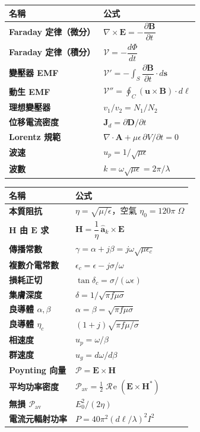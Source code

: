 \documentclass[12pt,a4paper]{article}
\newcommand{\vE}{\mathbf{E}}
\newcommand{\vB}{\mathbf{B}}
\newcommand{\vH}{\mathbf{H}}
\newcommand{\vJ}{\mathbf{J}}
\newcommand{\vD}{\mathbf{D}}
\newcommand{\vA}{\mathbf{A}}
\newcommand{\vu}{\mathbf{u}}
\newcommand{\ak}{\hat{\mathbf{a}}_k}
\newcommand{\emf}{\mathcal{V}}
\newcommand{\Rea}{\operatorname{\mathcal{R}\!e}}
\begin{document}
\begin{keybox}
\renewcommand{\arraystretch}{2.0}
\begin{tabular}{>{\bfseries}p{4cm} l}
\toprule
名稱 & 公式 \\
\midrule
Faraday 定律（微分） & $\nabla\times\vE = -\dfrac{\partial\vB}{\partial t}$ \\
Faraday 定律（積分） & $\emf = -\dfrac{d\Phi}{dt}$ \\
變壓器 EMF & $\emf' = -\displaystyle\int_S\dfrac{\partial\vB}{\partial t}\cdot d\mathbf{s}$ \\
動生 EMF & $\emf'' = \displaystyle\oint_C (\vu\times\vB)\cdot d\boldsymbol{\ell}$ \\
理想變壓器 & $v_1/v_2 = N_1/N_2$ \\
位移電流密度 & $\vJ_d = \partial\vD/\partial t$ \\
Lorentz 規範 & $\nabla\cdot\vA + \mu\epsilon\,\partial V/\partial t = 0$ \\
波速 & $u_p = 1/\sqrt{\mu\epsilon}$ \\
波數 & $k = \omega\sqrt{\mu\epsilon} = 2\pi/\lambda$ \\
\bottomrule
\end{tabular}
\end{keybox}

\begin{keybox}
\renewcommand{\arraystretch}{2.0}
\begin{tabular}{>{\bfseries}p{4cm} l}
\toprule
名稱 & 公式 \\
\midrule
本質阻抗 & $\eta = \sqrt{\mu/\epsilon}$，空氣 $\eta_0 = 120\pi\;\Omega$ \\
$\vH$ 由 $\vE$ 求 & $\vH = \dfrac{1}{\eta}\,\ak\times\vE$ \\
傳播常數 & $\gamma = \alpha + j\beta = j\omega\sqrt{\mu\epsilon_c}$ \\
複數介電常數 & $\epsilon_c = \epsilon - j\sigma/\omega$ \\
損耗正切 & $\tan\delta_c = \sigma/(\omega\epsilon)$ \\
集膚深度 & $\delta = 1/\sqrt{\pi f\mu\sigma}$ \\
良導體 $\alpha,\beta$ & $\alpha = \beta = \sqrt{\pi f\mu\sigma}$ \\
良導體 $\eta_c$ & $(1+j)\sqrt{\pi f\mu/\sigma}$ \\
相速度 & $u_p = \omega/\beta$ \\
群速度 & $u_g = d\omega/d\beta$ \\
Poynting 向量 & $\boldsymbol{\mathcal{P}} = \vE\times\vH$ \\
平均功率密度 & $\boldsymbol{\mathcal{P}}_{\text{av}} = \frac{1}{2}\Rea(\vE\times\vH^*)$ \\
無損 $\boldsymbol{\mathcal{P}}_{\text{av}}$ & $E_0^2/(2\eta)$ \\
電流元輻射功率 & $P = 40\pi^2(d\ell/\lambda)^2 I^2$ \\
\bottomrule
\end{tabular}
\end{keybox}
\end{document}
